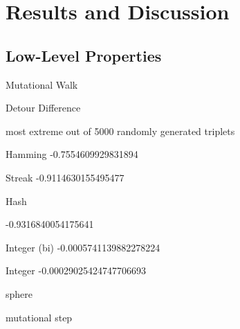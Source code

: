 \section{Results and Discussion}

\subsection{Low-Level Properties}

Mutational Walk




Detour Difference



most extreme out of 5000 randomly generated triplets

Hamming
-0.7554609929831894

Streak
-0.9114630155495477

Hash

-0.9316840054175641

Integer (bi)
-0.0005741139882278224

Integer
-0.00029025424747706693

sphere





mutational step

